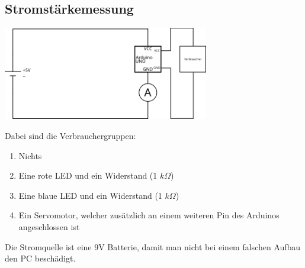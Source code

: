\documentclass[8pt, letterpaper]{article}
\begin{document}
\subsection{Stromstärkemessung}
\includegraphics[width=9cm]{ampere}

Dabei sind die Verbrauchergruppen:
\begin{enumerate}
  \item Nichts
  \item Eine rote LED und ein Widerstand (1 \(k\Omega\))
  \item Eine blaue LED und ein Widerstand (1 \(k\Omega\))
  \item Ein Servomotor, welcher zusätzlich an einem weiteren Pin des Arduinos angeschlossen ist
\end{enumerate}

Die Stromquelle ist eine 9V Batterie, damit man nicht bei einem falschen Aufbau den PC beschädigt.
\end{document}

